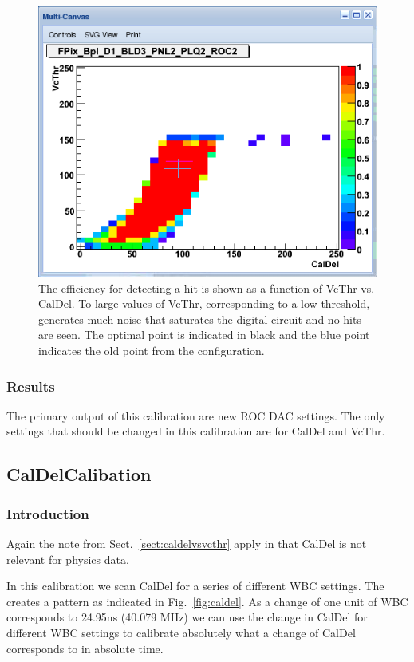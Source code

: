 \begin{figure}[htbp]
\begin{center}
\includegraphics[width=0.8\linewidth]{VcThrCalDel_example.png}
\end{center}
\caption{The efficiency for detecting a hit is shown as a function of VcThr vs. CalDel. To large values of VcThr, corresponding to a low threshold, generates  much noise that saturates the digital circuit and no hits are seen. The optimal point is indicated in black and the blue point indicates the old point from the configuration. }
\label{fig:thresholdCalDel}
\end{figure}

\subsubsection{Results}
The primary output of this calibration are new ROC DAC settings. The only settings that should be changed in this calibration are for CalDel and VcThr.

\subsection{CalDelCalibation}

\subsubsection{Introduction}
Again the note from Sect.~\ref{sect:caldelvsvcthr} apply in that CalDel is not relevant for physics data.

In this calibration we scan CalDel for a series of different WBC settings. The creates a pattern as indicated in Fig.~\ref{fig:caldel}. As a change of one unit of WBC corresponds to  24.95ns (40.079 MHz) we can use the change in  CalDel for different WBC settings to calibrate absolutely what a change of CalDel corresponds to in absolute time. 

